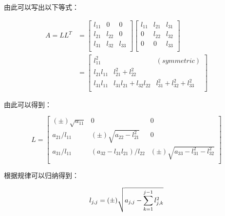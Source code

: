 由此可以写出以下等式：

\begin{equation*}
    \begin{aligned}
        A = LL^T & =
        \begin{bmatrix}
            l_{11} & 0      & 0      \\
            l_{21} & l_{22} & 0      \\
            l_{31} & l_{32} & l_{33} \\
        \end{bmatrix}
        \begin{bmatrix}
            l_{11} & l_{21} & l_{31} \\
            0      & l_{22} & l_{32} \\
            0      & 0      & l_{33} \\
        \end{bmatrix} \\
                 & =
        \begin{bmatrix}
            l_{11}^2     &                             & (symmetric)                     \\
            l_{21}l_{11} & l_{21}^2 + l_{22}^2                                           \\
            l_{31}l_{11} & l_{31}l_{21} + l_{32}l_{22} & l_{31}^2 + l_{32}^2 + l_{33} ^2 \\
        \end{bmatrix}
    \end{aligned}
\end{equation*}

由此可以得到：

\begin{equation*}
    L =
    \begin{bmatrix}
        (\pm) \sqrt{a_{11}} & 0                            & 0                                     \\
        a_{21} / l_{11}     & (\pm)\sqrt{a_{22}-l_{21}^2}  & 0                                     \\
        a_{31} / l_{11}     & (a_{32}-l_{31}l_{21})/l_{22} & (\pm) \sqrt{a_{33}-l_{31}^2-l_{32}^2} \\
    \end{bmatrix}
\end{equation*}

根据规律可以归纳得到：

\begin{equation*}
    l_{j,j} = (\pm) \sqrt{a_{j,j} - \sum_{k=1}^{j-1} l_{j,k}^2} \\
\end{equation*}

